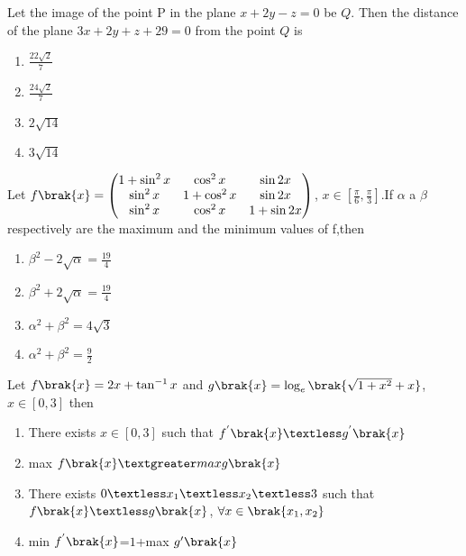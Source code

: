 \iffalse
\title{Assignment 3}
\author{AI24BTECH11018}
\section{mcq-single}
\fi

\item Let the image of the point P in the plane $x+2y-z=0$ be $Q$. Then the distance of the plane 
$3x + 2y + z + 29 = 0$ from the point $Q$ is
\hfill{}
\begin{enumerate}
    \item $\frac{22\sqrt{2}}{7}$
    \item $\frac{24\sqrt{2}}{7}$
    \item $2\sqrt{14}$
    \item $3\sqrt{14}$
\end{enumerate}
\item Let $f\brak{x}=\begin{pmatrix}
1+\sin^2{x} & \cos^2{x} & \sin 2x \\
\sin^2{x} & 1+\cos^2{x} & \sin 2x \\
\sin^2{x} & \cos^2{x} & 1+\sin 2x
\end{pmatrix}$, $x\in [\frac{\pi}{6},\frac{\pi}{3}]$.If $\alpha$ a $\beta$ respectively are the maximum and the minimum values of f,then
\hfill{}
\begin{enumerate}
    \item $\beta^2-2\sqrt{\alpha}=\frac{19}{4}$
    \item $\beta^2+2\sqrt{\alpha}=\frac{19}{4}$
    \item $\alpha^2 + \beta^2 = 4\sqrt{3}$
    \item $\alpha^2 + \beta^2 = \frac{9}{2}$
\end{enumerate}
\item Let $f\brak{x}=2x+\tan^{-1}x$ and $g\brak{x}=\log_{e}\brak{\sqrt{1+x^2}+x}$, $x\in [0,3]$ then 
\hfill{}
\begin{enumerate}
    \item There exists $x\in [0,3]$ such that $f^{'}\brak{x} \textless g^{'}\brak{x}$
    \item max $f\brak{x} \textgreater max g\brak{x}$
    \item There exists $0 \textless x_1 \textless x_2\textless 3$ such that $f\brak{x} \textless g\brak{x}$, $\forall x\in \brak{x_1,x_2}$
    \item min $f^{'}\brak{x}$=$1$+max $ g^\prime \brak{x}$
\end{enumerate}

